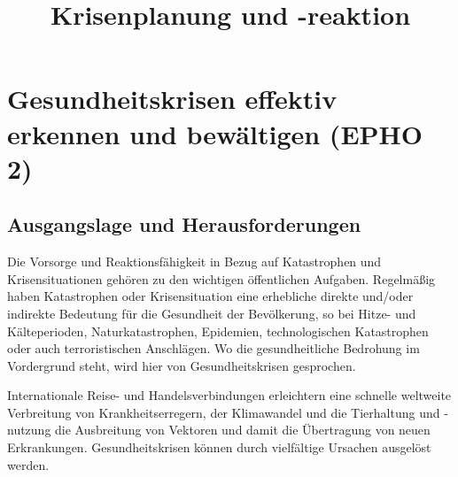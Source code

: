 \documentclass{article}
\begin{document}
\title{Krisenplanung und -reaktion}

\maketitle


\section{Gesundheitskrisen effektiv erkennen und bewältigen (EPHO 2)}\label{H1305287}



\subsection{Ausgangslage und Herausforderungen }\label{H3902609}



Die Vorsorge und Reaktionsfähigkeit in Bezug auf Katastrophen und Krisensituationen gehören zu den wichtigen öffentlichen Aufgaben. Regelmäßig haben Katastrophen oder Krisensituation eine erhebliche direkte und/oder indirekte Bedeutung für die Gesundheit der Bevölkerung, so bei Hitze- und Kälteperioden, Naturkatastrophen, Epidemien, technologischen Katastrophen oder auch terroristischen Anschlägen. Wo die gesundheitliche Bedrohung im Vordergrund steht, wird hier von Gesundheitskrisen gesprochen. 


Internationale Reise- und Handelsverbindungen erleichtern eine schnelle weltweite Verbreitung von Krankheitserregern, der Klimawandel und die Tierhaltung und -nutzung die Ausbreitung von Vektoren und damit die Übertragung von neuen Erkrankungen. Gesundheitskrisen können durch vielfältige Ursachen ausgelöst werden. 
\end{document}
